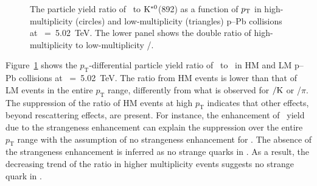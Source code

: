 \begin{figure}[!hbt]
	\centering
	\caption{The particle yield ratio of \fzero~to $\rm{}K^{*0}$(892) as a function of $p_{\rm{T}}$ in high-multiplicity (circles) and low-multiplicity (triangles) p--Pb collisions at \snn~=~5.02~TeV. The lower panel shows the double ratio of high-multiplicity to low-multiplicity \fzero/\kstar.  }
	\label{fig:f0KsPt}
\end{figure}

Figure~\ref{fig:f0KsPt} shows the $p_{\mathrm{T}}$-differential particle yield ratio of \fzero~to \kstar~in HM and LM p--Pb collisions at \snn~=~5.02~TeV. The ratio from HM events is lower than that of LM events in the entire $p_{\mathrm{T}}$ range, differently from what is observed for \kstar$\rm{}/K$ or \fzero/$\pi$. The suppression of the ratio of HM events at high $p_{\mathrm{T}}$ indicates that other effects, beyond rescattering effects, are present. For instance, the enhancement of \kstar~yield due to the strangeness enhancement can explain the suppression over the entire $p_{\mathrm{T}}$ range with the assumption of no strangeness enhancement for \fzero. The absence of the strangeness enhancement is inferred as no strange quarks in \fzero. As a result, the decreasing trend of the ratio in higher multiplicity events suggests no strange quark in \fzero.

